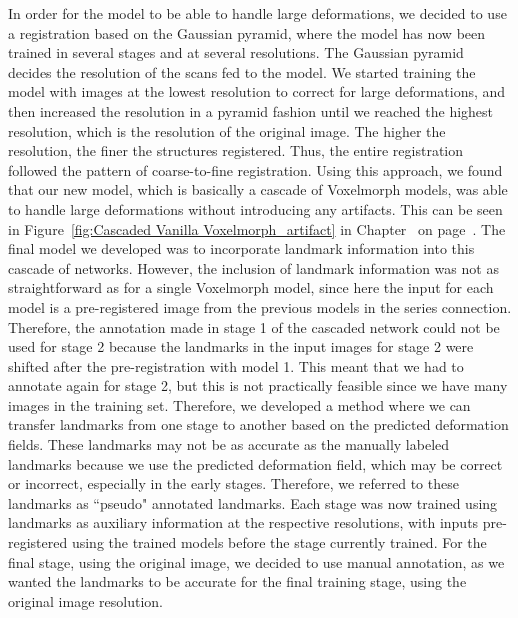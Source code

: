 \documentclass{book}
\begin{document}
	In order for the model to be able to handle large deformations, we decided to use a registration based on the Gaussian pyramid, where the model has now been trained in several stages and at several resolutions. The Gaussian pyramid decides the resolution of the scans fed to the model. We started training the model with images at the lowest resolution to correct for large deformations, and then increased the resolution in a pyramid fashion until we reached the highest resolution, which is the resolution of the original image. The higher the resolution, the finer the structures registered. Thus, the entire registration followed the pattern of coarse-to-fine registration. Using this approach, we found that our new model, which is basically a cascade of Voxelmorph models, was able to handle large deformations without introducing any artifacts. This can be seen in Figure~\ref{fig:Cascaded Vanilla Voxelmorph_artifact} in Chapter~ on page~\pageref{fig:Cascaded Vanilla Voxelmorph_artifact}. The final model we developed was to incorporate landmark information into this cascade of networks. However, the inclusion of landmark information was not as straightforward as for a single Voxelmorph model, since here the input for each model is a pre-registered image from the previous models in the series connection. Therefore, the annotation made in stage 1 of the cascaded network could not be used for stage 2 because the landmarks in the input images for stage 2 were shifted after the pre-registration with model 1. This meant that we had to annotate again for stage 2, but this is not practically feasible since we have many images in the training set. Therefore, we developed a method where we can transfer landmarks from one stage to another based on the predicted deformation fields. These landmarks may not be as accurate as the manually labeled landmarks because we use the predicted deformation field, which may be correct or incorrect, especially in the early stages. Therefore, we referred to these landmarks as ``pseudo" annotated landmarks. Each stage was now trained using landmarks as auxiliary information at the respective resolutions, with inputs pre-registered using the trained models before the stage currently trained. For the final stage, using the original image, we decided to use manual annotation, as we wanted the landmarks to be accurate for the final training stage, using the original image resolution.
	
\end{document}

